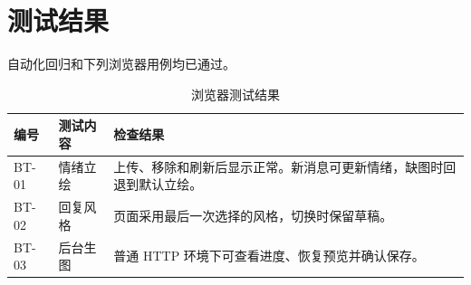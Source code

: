 \section{测试结果}
自动化回归和下列浏览器用例均已通过。

\begin{table}[H]\centering\small
\caption{浏览器测试结果}
\begin{tabularx}{\linewidth}{@{}p{18mm}p{36mm}X@{}}\toprule
编号 & 测试内容 & 检查结果 \\ \midrule
BT-01 & 情绪立绘 & 上传、移除和刷新后显示正常。新消息可更新情绪，缺图时回退到默认立绘。 \\
BT-02 & 回复风格 & 页面采用最后一次选择的风格，切换时保留草稿。 \\
BT-03 & 后台生图 & 普通 HTTP 环境下可查看进度、恢复预览并确认保存。 \\ \bottomrule
\end{tabularx}\end{table}
